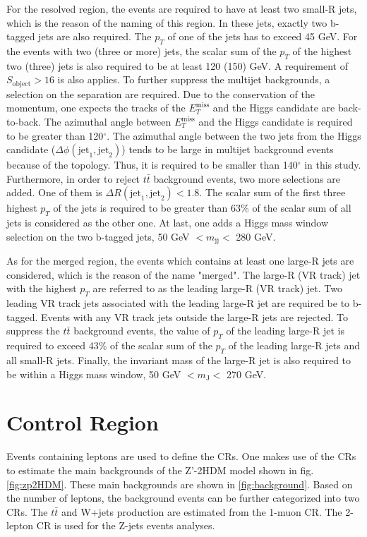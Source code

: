 \documentclass[class=NCU_thesis, crop=false]{standalone}
\begin{document}
	For the resolved region, the events are required to have at least two small-R jets, which is the reason of the naming of this region. In these jets, exactly two b-tagged jets are also required. The $p_T$ of one of the jets has to exceed 45 GeV. For the events with two (three or more) jets, the scalar sum of the $p_T$ of the highest two (three) jets is also required to be at least 120 (150) GeV. A requirement of $S_{\mathrm{object}} > 16$ is also applies. To further suppress the multijet backgrounds, a selection on the separation are required. Due to the conservation of the momentum, one expects the tracks of the $E_T^{\mathrm{miss}}$ and the Higgs candidate are back-to-back. The azimuthal angle between $E_T^{\mathrm{miss}}$ and the Higgs candidate is required to be greater than 120$^\circ$. The azimuthal angle between the two jets from the Higgs candidate ($\Delta \phi(\mathrm{jet}_1, \mathrm{jet}_2)$) tends to be large in multijet background events because of the topology. Thus, it is required to be smaller than 140$^\circ$ in this study. Furthermore, in order to reject $t\bar{t}$ background events, two more selections are added. One of them is $\Delta R(\mathrm{jet}_1, \mathrm{jet}_2) < 1.8$. The scalar sum of the first three highest $p_T$ of the jets is required to be greater than 63\% of the scalar sum of all jets is considered as the other one. At last, one adds a Higgs mass window selection on the two b-tagged jets, 50 GeV $< m_{\mathrm{jj}} <$ 280 GeV.
	
	As for the merged region, the events which contains at least one large-R jets are considered, which is the reason of the name "merged". The large-R (VR track) jet with the highest $p_T$ are referred to as the leading large-R (VR track) jet. Two leading VR track jets associated with the leading large-R jet are required be to b-tagged. Events with any VR track jets outside the large-R jets are rejected. To suppress the $t\bar{t}$ background events, the value of $p_T$ of the leading large-R jet is required to exceed 43\% of the scalar sum of the $p_T$ of the leading large-R jets and all small-R jets. Finally, the invariant mass of the large-R jet is also required to be within a Higgs mass window, 50 GeV $< m_{\mathrm{J}} <$ 270 GeV.
	
\section{Control Region}
	Events containing leptons are used to define the CRs. One makes use of the CRs to estimate the main backgrounds of the Z'-2HDM model shown in fig. \ref{fig:zp2HDM}. These main backgrounds are shown in \ref{fig:background}. Based on the number of leptons, the background events can be further categorized into two CRs. The $t\bar{t}$ and W+jets production are estimated from the 1-muon CR. The 2-lepton CR is used for the Z-jets events analyses.
	
\end{document}
